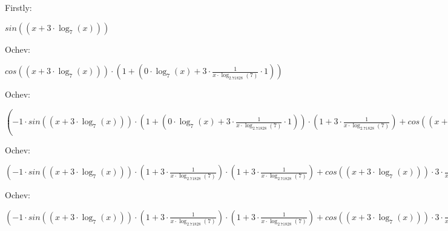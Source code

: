 \documentclass[12pt]{article}
\begin{document}
Firstly: 
\begin{center}
$ sin\left((x + 3 \cdot \log_{7} \left(x\right))\right) $
\end{center}
Ochev: 
\begin{center}
$ cos\left((x + 3 \cdot \log_{7} \left(x\right))\right) \cdot (1 + (0 \cdot \log_{7} \left(x\right) + 3 \cdot \frac{1}{x \cdot \log_{2.71828} \left(7\right)} \cdot 1)) $
\end{center}
Ochev: 
\begin{center}
$ (-1 \cdot sin\left((x + 3 \cdot \log_{7} \left(x\right))\right) \cdot (1 + (0 \cdot \log_{7} \left(x\right) + 3 \cdot \frac{1}{x \cdot \log_{2.71828} \left(7\right)} \cdot 1)) \cdot (1 + 3 \cdot \frac{1}{x \cdot \log_{2.71828} \left(7\right)}) + cos\left((x + 3 \cdot \log_{7} \left(x\right))\right) \cdot (0 + (0 \cdot \frac{1}{x \cdot \log_{2.71828} \left(7\right)} + 3 \cdot \frac{(0 \cdot x \cdot \log_{2.71828} \left(7\right) - 1 \cdot (1 \cdot \log_{2.71828} \left(7\right) + x \cdot \frac{1}{7 \cdot \log_{2.71828} \left(2.71828\right)} \cdot 0))}{x \cdot \log_{2.71828} \left(7\right) \cdot x \cdot \log_{2.71828} \left(7\right)}))) $
\end{center}
Ochev: 
\begin{center}
$ (-1 \cdot sin\left((x + 3 \cdot \log_{7} \left(x\right))\right) \cdot (1 + 3 \cdot \frac{1}{x \cdot \log_{2.71828} \left(7\right)}) \cdot (1 + 3 \cdot \frac{1}{x \cdot \log_{2.71828} \left(7\right)}) + cos\left((x + 3 \cdot \log_{7} \left(x\right))\right) \cdot 3 \cdot \frac{\log_{2.71828} \left(7\right)}{x \cdot \log_{2.71828} \left(7\right) \cdot x \cdot \log_{2.71828} \left(7\right)}) $
\end{center}
Ochev: 
\begin{center}
$ (-1 \cdot sin\left((x + 3 \cdot \log_{7} \left(x\right))\right) \cdot (1 + 3 \cdot \frac{1}{x \cdot \log_{2.71828} \left(7\right)}) \cdot (1 + 3 \cdot \frac{1}{x \cdot \log_{2.71828} \left(7\right)}) + cos\left((x + 3 \cdot \log_{7} \left(x\right))\right) \cdot 3 \cdot \frac{\log_{2.71828} \left(7\right)}{x \cdot \log_{2.71828} \left(7\right) \cdot x \cdot \log_{2.71828} \left(7\right)}) $
\end{center}
\end{document}
